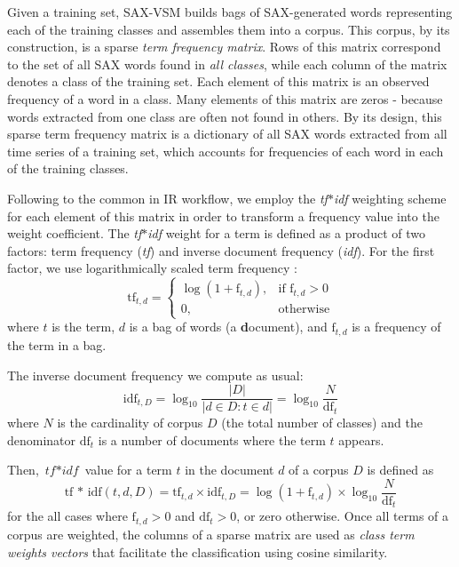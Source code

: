 \documentclass[conference]{IEEEtran}
\begin{document}
Given a training set, SAX-VSM builds bags of SAX-generated words representing 
each of the training classes and assembles them into a corpus. 
This corpus, by its construction, is a sparse \textit{term frequency matrix}. 
Rows of this matrix correspond to the set of all SAX words found in 
\textit{all classes}, while each column of the matrix denotes a class of the 
training set. Each element of this matrix is an observed frequency of a word
in a class. 
Many elements of this matrix are zeros - because words extracted from one class 
are often not found in others.
By its design, this sparse 
term frequency matrix is a dictionary of all SAX words extracted from all time 
series of a training set, which accounts for frequencies of each word in each of 
the training classes.

Following to the common in IR workflow, we employ the \textit{tf$\ast$idf} weighting 
scheme for each element of this matrix in order to transform a frequency value into
the weight coefficient. 
The \textit{tf$\ast$idf} weight for a term is defined as a 
product of two factors: term frequency (\textit{tf}) and inverse document 
frequency (\textit{idf}). 
For the first factor, we use logarithmically scaled term frequency \cite{logtf}:
\begin{equation}
 \mbox{tf}_{t, d} =  \begin{cases} \log(1 + \mbox{f}_{t,d}), &\mbox{if f}_{t,d}>0  \\
0, & \mbox{otherwise} \end{cases}
\end{equation} 
where $t$ is the term, $d$ is a bag of words (a \textbf{d}ocument), and $\mbox{f}_{t,d}$ 
is a frequency of the term in a bag.

The inverse document frequency we compute as usual:
\begin{equation}
 \mbox{idf}_{t, D} =  \log_{10}\frac{|D|}{|d \in D : t \in d|} = \log_{10}\frac{N}{\mbox{df}_{t}}
\end{equation} 
where $N$ is the cardinality of corpus $D$ (the total number of classes) and the 
denominator $\mbox{df}_{t}$ is a number of documents where the term $t$ appears.

Then, $\textit{tf$\ast$idf}$ value for a term $t$ in the document $d$ of a corpus $D$ is defined as 
\begin{equation}
 \mbox{tf * idf}(t, d, D) =  \mbox{tf}_{t, d} \times \mbox{idf}_{t, D} = \log(1 + \mbox{f}_{t,d})
\times \log_{10}\frac{N}{\mbox{df}_{t}}
 \label{formula:tfidf}
\end{equation} 
for the all cases where $\mbox{f}_{t,d}>0$ and $\mbox{df}_{t}>0$, or zero otherwise.
Once all terms of a corpus are weighted, the columns of a sparse matrix are used 
as \textit{class term weights vectors} that facilitate the classification using cosine similarity. 
\end{document}
